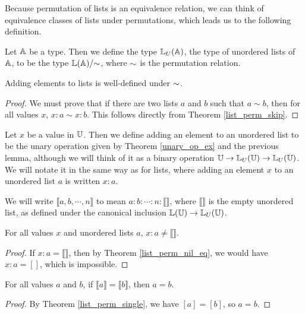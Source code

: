 \documentclass[../../math.tex]{subfiles}
\begin{document}
Because permutation of lists is an equivalence relation, we can think of
equivalence classes of lists under permutations, which leads us to the following
definition.

\begin{definition}
    Let $\mathbb{A}$ be a type.  Then we define the type $\mathbb{L}_U(\mathbb{A})$, the type of
    unordered lists of $\mathbb{A}$, to be the type  $\mathbb{L}(\mathbb{A})/{\sim}$, where ${\sim}$ is
    the permutation relation.
\end{definition}

\begin{lemma}
    Adding elements to lists is well-defined under ${\sim}$.
\end{lemma}
\begin{proof}
    We must prove that if there are two lists $a$ and $b$ such that $a \sim b$,
    then for all values $x$, $x : a \sim x : b$.  This follows directly from
    Theorem \ref{list_perm_skip}.
\end{proof}

\begin{definition}
    Let $x$ be a value in $\mathbb{U}$.  Then we define adding an element to an
    unordered list to be the unary operation given by Theorem \ref{unary_op_ex}
    and the previous lemma, although we will think of it as a binary operation
    $\mathbb{U} \to \mathbb{L}_U(\mathbb{U}) \to \mathbb{L}_U(\mathbb{U})$.  We will notate it in the same way as for
    lists, where adding an element $x$ to an unordered list $a$ is written $x :
    a$.
\end{definition}

We will write $\llbracket a, b, \cdots, n\rrbracket$ to mean $a : b : \cdots : n
: \llbracket \rrbracket$, where $\llbracket \rrbracket$ is the empty unordered
list, as defined under the canonical inclusion $\mathbb{L}(\mathbb{U}) \to \mathbb{L}_U(\mathbb{U})$.

\begin{theorem} \label{ulist_end_neq}
    For all values $x$ and unordered lists $a$, $x : a \neq \llbracket
    \rrbracket$.
\end{theorem}
\begin{proof}
    If $x : a = \llbracket \rrbracket$, then by Theorem \ref{list_perm_nil_eq},
    we would have $x : a = []$, which is impossible.
\end{proof}

\begin{theorem} \label{ulist_single_eq}
    For all values $a$ and $b$, if $\llbracket a \rrbracket = \llbracket b
    \rrbracket$, then $a = b$.
\end{theorem}
\begin{proof}
    By Theorem \ref{list_perm_single}, we have $[a] = [b]$, so $a = b$.
\end{proof}
\end{document}
